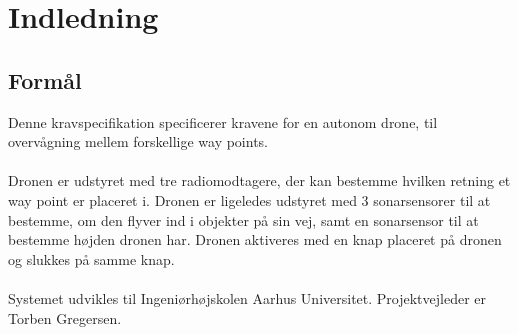 \documentclass[Main]{subfiles}
\begin{document}
\chapter{Indledning}

\section{Formål}

Denne kravspecifikation specificerer kravene for en autonom drone, til overvågning mellem forskellige way points.
\\
\\
Dronen er udstyret med tre radiomodtagere, der kan bestemme hvilken retning et way point er placeret i.
Dronen er ligeledes udstyret med 3 sonarsensorer til at bestemme, om den flyver ind i objekter på sin vej, samt en sonarsensor til at bestemme højden dronen har.
Dronen aktiveres med en knap placeret på dronen og slukkes på samme knap.
\\
\\
Systemet udvikles til Ingeniørhøjskolen Aarhus Universitet.
Projektvejleder er Torben Gregersen.
\end{document}
